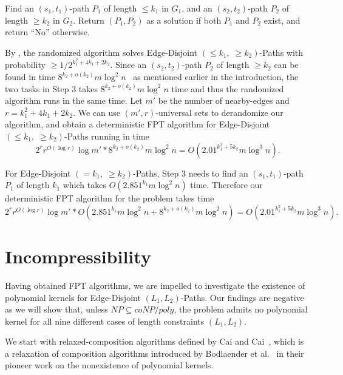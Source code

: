 \documentclass{llncs}
\begin{document}
 Find an $(s_1,t_1)$-path $P_1$ of length $\le k_1$ in $G_1$, and an
$(s_2,t_2)$-path $P_2$ of length $\ge k_2$ in $G_2$.
Return $(P_1,P_2)$ as a solution if both $P_1$ and $P_2$ exist,
and return ``No'' otherwise.

By , the randomized algorithm solves {\sc Edge-Disjoint $(\le k_1, \; \ge k_2)$-Paths}
with probability $\ge 1 / 2^{k^2_1 + 4k_1 + 2k_2}$.  
Since an $(s_2,t_2)$-path $P_2$ of length $\ge k_2$ can be found in time $8^{k_2 + o(k_2)} m\log ^2 n$~\cite{fomin2014efficient} as mentioned earlier in the introduction, 
the two tasks in Step 3 takes $8^{k_2 + o(k_2)} m\log ^2 n$ time and thus 
the randomized algorithm runs in the same time. 
Let $m'$ be the number of nearby-edges and $r = k^2_1 + 4k_1 + 2k_2$.
We can use $(m',r)$-universal sets to derandomize our algorithm, and obtain
a deterministic FPT algorithm for {\sc Edge-Disjoint $(\le k_1, \; \ge k_2)$-Paths} running in time
\[ 2^{r}r^{O(\log r)} \log m' * 8^{k_2 + o(k_2)} m \log ^2 n = O(2.01^{k_1^2 + 5k_2} m \log^3 n).\]

For {\sc Edge-Disjoint $(= k_1, \; \ge k_2)$-Paths}, Step 3 needs to find
an $(s_1, t_1)$-path $P_1$ of length $k_1$ which takes $O(2.851^{k_1} m \log^2 n)$ time.
Therefore our deterministic FPT algorithm for the problem takes time
\[ 2^{r}r^{O(\log r)} \log m' * O(2.851^{k_1} m \log^2 n + 8^{k_2 + o(k_2)} m\log ^2 n) = O(2.01^{k_1^2 + 5k_2} m \log^3 n). \]


\section{Incompressibility}

Having obtained FPT algorithms, we are impelled to investigate the existence of polynomial
kernels for {\sc Edge-Disjoint $(L_1, L_2)$-Paths}.
Our findings are negative as we will show that, unless $NP \subseteq coNP/poly$,
the problem admits no polynomial kernel for all nine different cases of length
constraints $(L_1, L_2)$.

We start with relaxed-composition algorithms defined
by Cai and Cai~\cite{cai2014incompressibility},
which is a relaxation of composition algorithms introduced by
Bodlaender et al.~\cite{bodlaender2009problems} in their pioneer work on
the nonexistence of polynomial kernels.
\end{document}
